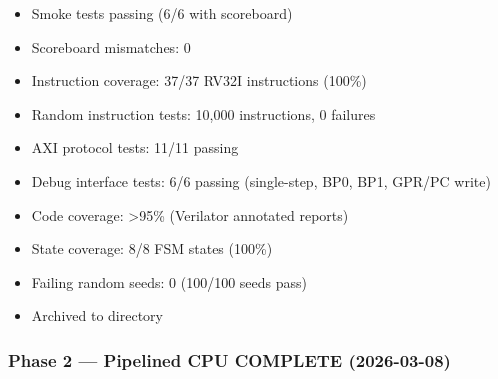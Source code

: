 \begin{record}
\begin{itemize}
\tightlist
\item
  \ok{} Smoke tests passing (6/6 with scoreboard)
\item
  \ok{} Scoreboard mismatches: 0
\item
  \ok{} Instruction coverage: 37/37 RV32I instructions (100\%)
\item
  \ok{} Random instruction tests: 10,000 instructions, 0 failures
\item
  \ok{} AXI protocol tests: 11/11 passing
\item
  \ok{} Debug interface tests: 6/6 passing (single-step, BP0, BP1,
  GPR/PC write)
\item
  \ok{} Code coverage: \textgreater95\% (Verilator annotated reports)
\item
  \ok{} State coverage: 8/8 FSM states (100\%)
\item
  \ok{} Failing random seeds: 0 (100/100 seeds pass)
\item
  \ok{} Archived to  directory
\end{itemize}

\end{record}

\subsubsection{\texorpdfstring{Phase 2 --- Pipelined CPU \ok{} COMPLETE
(2026-03-08)}{Phase 2 --- Pipelined CPU  COMPLETE (2026-03-08)}}\label{cr:status:roadmap:phase-2-pipelined-cpu-white-check-mark-complete-2026-03-08}

